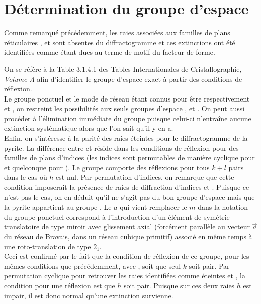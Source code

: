 \section{Détermination du groupe d'espace}

Comme remarqué précédemment, les raies associées aux familles de plans réticulaires ,  et  sont absentes du diffractogramme et ces extinctions ont été identifiées comme étant dues au terme de motif du facteur de forme.

On se réfère à la Table 3.1.4.1 des Tables Internationales de Cristallographie, \textit{Volume A} \cite{LooijengaVosIUCr2006} afin d'identifier le groupe d'espace exact à partir des conditions de réflexion.\\
Le groupe ponctuel et le mode de réseau étant connus pour être respectivement  et , on restreint les possibilités aux seuls groupes d'espace ,  et .
On peut aussi procéder à l'élimination immédiate du groupe  puisque celui-ci n'entraîne aucune extinction systématique alors que l'on sait qu'il y en a.\\
Enfin, on s'intéresse à la parité des raies éteintes pour le diffractogramme de la pyrite.
La différence entre  et  réside dans les conditions de réflexion pour des familles de plans d'indices  (les indices sont permutables de manière cyclique pour  et quelconque pour ).
Le groupe  comporte des réflexions pour tous \(k + l\) pairs dans le cas où \(h\) est nul.
Par permutation d'indices, on remarque que cette condition imposerait la présence de raies de diffraction d'indices  et .
Puisque ce n'est pas le cas, on en déduit qu'il ne s'agit pas du bon groupe d'espace mais que la pyrite appartient au groupe .
Le \(a\) qui vient remplacer le \(m\) dans la notation du groupe ponctuel correspond à l'introduction d'un élément de symétrie translatoire de type miroir avec glissement axial (forcément parallèle au vecteur \(\vec{a}\) du réseau de Bravais, dans un réseau cubique primitif) associé en même temps à une roto-translation de type \(2_1\).\\
Ceci est confirmé par le fait que la condition de réflexion de ce groupe, pour les mêmes conditions que précédemment, avec , soit que seul \(k\) soit pair.
Par permutation cyclique pour retrouver les raies identifiées comme éteintes  et , la condition pour une réflexion est que \(h\) soit pair.
Puisque sur ces deux raies \(h\) est impair, il est donc normal qu'une extinction survienne.

